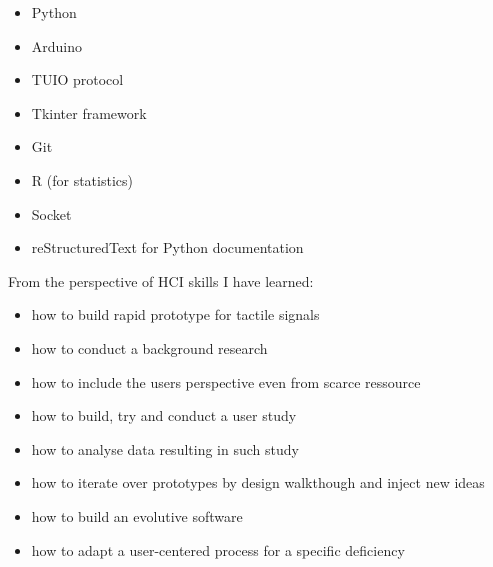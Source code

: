 \begin{itemize}
	\item Python
	\item Arduino
	\item TUIO protocol
	\item Tkinter framework
	\item Git
	\item R (for statistics)
	\item Socket
	\item reStructuredText for Python documentation
\end{itemize}

From the perspective of HCI skills I have learned:

\begin{itemize}
	\item how to build rapid prototype for tactile signals
	\item how to conduct a background research
	\item how to include the users perspective even from scarce ressource
	\item how to build, try and conduct a user study
	\item how to analyse data resulting in such study
	\item how to iterate over prototypes by design walkthough and inject new ideas
	\item how to build an evolutive software
	\item how to adapt a user-centered process for a specific deficiency
\end{itemize}


